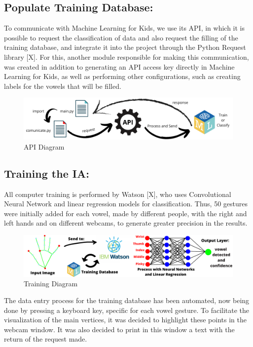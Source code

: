 \documentclass[a4paper, 12pt]{article}
\begin{document}
\subsection{Populate Training Database:}
To communicate with Machine Learning for Kids, we use its API, in which it is possible to request the classification of data and also request the filling of the training database, and integrate it into the project through the Python Request library [X]. For this, another module responsible for making this communication, was created in addition to generating an API access key directly in Machine Learning for Kids, as well as performing other configurations, such as creating labels for the vowels that will be filled.

 \begin{figure}[!ht]
\centering
\includegraphics[scale=0.5]{img/api_diagram.png}
\caption{API Diagram}
\label{figure_6}
\end{figure}





\subsection{Training the IA:}
All computer training is performed by Watson [X], who uses Convolutional Neural Network and linear regression models for classification. Thus, 50 gestures were initially added for each vowel, made by different people, with the right and left hands and on different webcams, to generate greater precision in the results.

 \begin{figure}[!ht]
\centering
\includegraphics[scale=0.5]{img/training_diagram.png}
\caption{Training Diagram}
\label{figure_7}
\end{figure}

The data entry process for the training database has been automated, now being done by pressing a keyboard key, specific for each vowel gesture.
To facilitate the visualization of the main vertices, it was decided to highlight these points in the webcam window. It was also decided to print in this window a text with the return of the request made.
\end{document}
